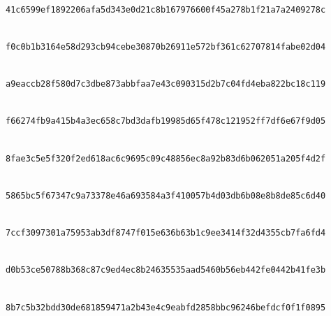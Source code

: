 \documentclass[pdflatex,sn-mathphys-num]{sn-jnl}%
\theoremstyle{thmstyleone}%
\theoremstyle{thmstyletwo}%
\theoremstyle{thmstylethree}%
\begin{document}
\begin{landscape}
\noindent{}\\
\texttt{41c6599e\allowbreak{}f1892206\allowbreak{}afa5d343\allowbreak{}e0d21c8b\allowbreak{}16797660\allowbreak{}0f45a278\allowbreak{}b1f21a7a\allowbreak{}2409278c}\par
\noindent{}\\
\texttt{f0c0b1b3\allowbreak{}164e58d2\allowbreak{}93cb94ce\allowbreak{}be30870b\allowbreak{}26911e57\allowbreak{}2bf361c6\allowbreak{}2707814f\allowbreak{}abe02d04}\par
\noindent{}\\
\texttt{a9eaccb2\allowbreak{}8f580d7c\allowbreak{}3dbe873a\allowbreak{}bbfaa7e4\allowbreak{}3c090315\allowbreak{}d2b7c04f\allowbreak{}d4eba822\allowbreak{}bc18c119}\par
\noindent{}\\
\texttt{f66274fb\allowbreak{}9a415b4a\allowbreak{}3ec658c7\allowbreak{}bd3dafb1\allowbreak{}9985d65f\allowbreak{}478c1219\allowbreak{}52ff7df6\allowbreak{}e67f9d05}\par
\noindent{}\\
\texttt{8fae3c5e\allowbreak{}5f320f2e\allowbreak{}d618ac6c\allowbreak{}9695c09c\allowbreak{}48856ec8\allowbreak{}a92b83d6\allowbreak{}b062051a\allowbreak{}205f4d2f}\par
\noindent{}\\
\texttt{5865bc5f\allowbreak{}67347c9a\allowbreak{}73378e46\allowbreak{}a693584a\allowbreak{}3f410057\allowbreak{}b4d03db6\allowbreak{}b08e8b8d\allowbreak{}e85c6d40}\par
\noindent{}\\
\texttt{7ccf3097\allowbreak{}301a7595\allowbreak{}3ab3df87\allowbreak{}47f015e6\allowbreak{}36b63b1c\allowbreak{}9ee3414f\allowbreak{}32d4355c\allowbreak{}b7fa6fd4}\par
\noindent{}\\
\texttt{d0b53ce5\allowbreak{}0788b368\allowbreak{}c87c9ed4\allowbreak{}ec8b2463\allowbreak{}5535aad5\allowbreak{}460b56eb\allowbreak{}442fe044\allowbreak{}2b41fe3b}\par
\noindent{}\\
\texttt{8b7c5b32\allowbreak{}bdd30de6\allowbreak{}81859471\allowbreak{}a2b43e4c\allowbreak{}9eabfd28\allowbreak{}58bbc962\allowbreak{}46befdcf\allowbreak{}0f1f0895}\par

\end{landscape}
\end{document}
